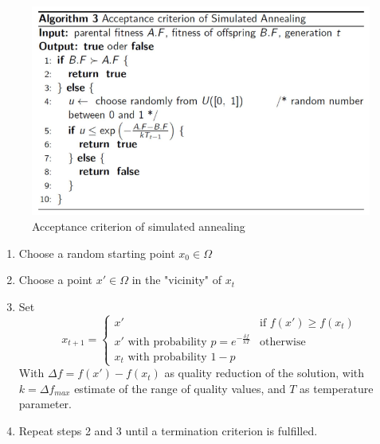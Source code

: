 \documentclass{article}
\begin{document}
\begin{figure}[H]
    \centering
    \includegraphics[scale=0.5]{images/sim_annealing_algo.png}
    \caption{Acceptance criterion of simulated annealing}
\end{figure}
\begin{enumerate}
    \item Choose a random starting point $x_0\in\Omega$
    \item Choose a point $x'\in\Omega$ in the "vicinity" of $x_t$
    \item Set
          \[
              x_{t+1}=
              \begin{cases}
                  x'                                                    & \text{if }f(x')\geq f(x_t) \\
                  x'\text{ with probability }p=e^{-\frac{\delta f}{kT}} & \text{otherwise}           \\
                  x_t\text{ with probability }1-p
              \end{cases}
          \]
          With $\Delta f=f(x')-f(x_t)$ as quality reduction of the solution, with $k=\Delta f_{max}$
          estimate of the range of quality values, and $T$ as temperature parameter.
    \item Repeat steps 2 and 3 until a termination criterion is fulfilled.
\end{enumerate}
\end{document}
